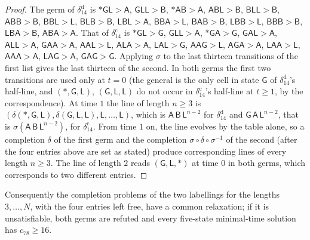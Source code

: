 \documentclass[11pt]{article}
\theoremstyle{definition}
\theoremstyle{remark}
\newcommand{\Lq}{\mathsf L}
\newcommand{\Gq}{\mathsf G}
\newcommand{\Aq}{\mathsf A}
\newcommand{\Bq}{\mathsf B}
\begin{document}
\begin{proof}
The germ of $\delta_{14}^{\mathrm d}$ is $\ast\Gq\Lq{>}\Aq$, $\Gq\Lq\Lq{>}\Bq$,
$\ast\Aq\Bq{>}\Aq$, $\Aq\Bq\Lq{>}\Bq$, $\Bq\Lq\Lq{>}\Bq$, $\Aq\Bq\Bq{>}\Bq$,
$\Bq\Bq\Lq{>}\Lq$, $\Bq\Lq\Bq{>}\Bq$, $\Lq\Bq\Lq{>}\Aq$, $\Bq\Bq\Aq{>}\Lq$,
$\Bq\Aq\Bq{>}\Bq$, $\Lq\Bq\Bq{>}\Lq$, $\Bq\Bq\Bq{>}\Bq$, $\Lq\Bq\Aq{>}\Bq$,
$\Aq\Bq\Aq{>}\Aq$. That of $\delta_{14}^{\mathrm c}$ is $\ast\Gq\Lq{>}\Gq$,
$\Gq\Lq\Lq{>}\Aq$, $\ast\Gq\Aq{>}\Gq$, $\Gq\Aq\Lq{>}\Aq$, $\Aq\Lq\Lq{>}\Aq$,
$\Gq\Aq\Aq{>}\Aq$, $\Aq\Aq\Lq{>}\Lq$, $\Aq\Lq\Aq{>}\Aq$, $\Lq\Aq\Lq{>}\Gq$,
$\Aq\Aq\Gq{>}\Lq$, $\Aq\Gq\Aq{>}\Aq$, $\Lq\Aq\Aq{>}\Lq$, $\Aq\Aq\Aq{>}\Aq$,
$\Lq\Aq\Gq{>}\Aq$, $\Gq\Aq\Gq{>}\Gq$. Applying $\sigma$ to the last thirteen
transitions of the first list gives the last thirteen of the second. In both
germs the first two transitions are used only at $t=0$ (the general is the only
cell in state $\Gq$ of $\delta_{14}^{\mathrm d}$'s half-line, and
$(\ast,\Gq,\Lq)$, $(\Gq,\Lq,\Lq)$ do not occur in $\delta_{14}^{\mathrm c}$'s half-line
at $t\ge1$, by the correspondence). At time $1$ the line of length $n\ge3$ is
$(\delta(\ast,\Gq,\Lq),\delta(\Gq,\Lq,\Lq),\Lq,\dots,\Lq)$, which is
$\Aq\,\Bq\,\Lq^{n-2}$ for $\delta_{14}^{\mathrm d}$ and $\Gq\,\Aq\,\Lq^{n-2}$, that
is $\sigma(\Aq\,\Bq\,\Lq^{n-2})$, for $\delta_{14}^{\mathrm c}$. From time $1$
on, the line evolves by the table alone, so a completion $\delta$ of the first
germ and the completion $\sigma\circ\delta\circ\sigma^{-1}$ of the second (after
the four entries above are set as stated) produce corresponding lines of every
length $n\ge3$. The line of length $2$ reads $(\Gq,\Lq,\ast)$ at time $0$ in
both germs, which corresponds to two different entries.
\end{proof}

Consequently the completion problems of the two labellings for the lengths
$3,\dots,N$, with the four entries left free, have a common relaxation; if it
is unsatisfiable, both germs are refuted and every five-state minimal-time
solution has $c_{78}\ge16$.
\end{document}
